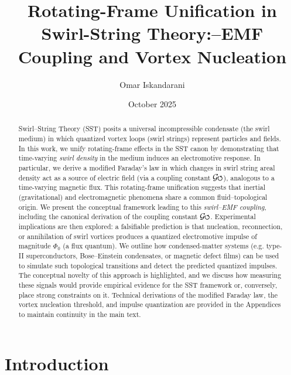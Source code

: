 \documentclass[12pt]{article}
\DeclareRobustCommand{\swirlarrow}{
\mathchoice{\mkern-2mu\scriptstyle\boldsymbol{\circlearrowleft}}%
{\mkern-2mu\scriptstyle\boldsymbol{\circlearrowleft}}%
{\mkern-2mu\scriptscriptstyle\boldsymbol{\circlearrowleft}}%
{\mkern-2mu\scriptscriptstyle\boldsymbol{\circlearrowleft}}
}%
\newcommand{\Gswirl}{\mathcal{G}\swirlarrow}
\begin{document}
\title{Rotating-Frame Unification in Swirl-String Theory:\Swirl--EMF Coupling and Vortex Nucleation}
\author{Omar Iskandarani}
\date{October 2025}

\begin{abstract}

\noindent Swirl--String Theory (SST) posits a universal incompressible condensate (the swirl medium) in which quantized vortex loops (swirl strings) represent particles and fields. In this work, we unify rotating-frame effects in the SST canon by demonstrating that time-varying \emph{swirl density} in the medium induces an electromotive response. In particular, we derive a modified Faraday's law in which changes in swirl string areal density act as a source of electric field (via a coupling constant $\Gswirl$), analogous to a time-varying magnetic flux. This rotating-frame unification suggests that inertial (gravitational) and electromagnetic phenomena share a common fluid–topological origin. We present the conceptual framework leading to this \emph{swirl--EMF coupling}, including the canonical derivation of the coupling constant $\Gswirl$. Experimental implications are then explored: a falsifiable prediction is that nucleation, reconnection, or annihilation of swirl vortices produces a quantized electromotive impulse of magnitude $\Phi_{0}$ (a flux quantum). We outline how condensed-matter systems (e.g. type-II superconductors, Bose–Einstein condensates, or magnetic defect films) can be used to simulate such topological transitions and detect the predicted quantized impulses. The conceptual novelty of this approach is highlighted, and we discuss how measuring these signals would provide empirical evidence for the SST framework or, conversely, place strong constraints on it. Technical derivations of the modified Faraday law, the vortex nucleation threshold, and impulse quantization are provided in the Appendices to maintain continuity in the main text.

\end{abstract}


\section{Introduction}
\end{document}
